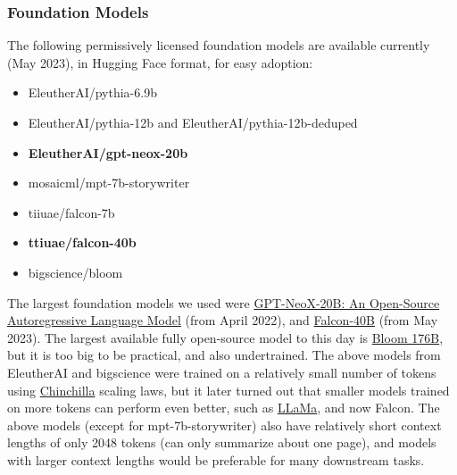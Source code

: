 \documentclass{article}
\begin{document}
\subsubsection{Foundation Models}
The following permissively licensed foundation models are available currently (May 2023), in Hugging Face format, for easy adoption:
\begin{itemize}
    \item EleutherAI/pythia-6.9b
    \item EleutherAI/pythia-12b and EleutherAI/pythia-12b-deduped
    \item \textbf{EleutherAI/gpt-neox-20b}
    \item mosaicml/mpt-7b-storywriter
    \item tiiuae/falcon-7b
    \item \textbf{ttiuae/falcon-40b}
    \item bigscience/bloom
\end{itemize}
The largest foundation models we used were \href{https://arxiv.org/abs/2204.06745}{GPT-NeoX-20B: An Open-Source Autoregressive Language Model} (from April 2022), and \href{https://huggingface.co/tiiuae/falcon-40b}{Falcon-40B} (from May 2023). The largest available fully open-source model to this day is \href{https://huggingface.co/bigscience/bloom}{Bloom 176B}, but it is too big to be practical, and also undertrained.
The above models from EleutherAI and bigscience were trained on a relatively small number of tokens using \href{https://arxiv.org/abs/2203.15556}{Chinchilla} scaling laws, but it later turned out that smaller models trained on more tokens can perform even better, such as \href{https://arxiv.org/abs/2302.13971}{LLaMa}, and now Falcon. The above models (except for mpt-7b-storywriter) also have relatively short context lengths of only 2048 tokens (can only summarize about one page), and models with larger context lengths would be preferable for many downstream tasks.
\end{document}

